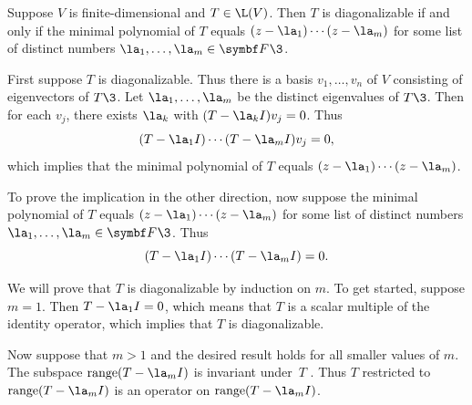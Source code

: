 \pagebreak[3]

{Suppose $V$ is finite-dimensional and $T \in \L(V)$. Then $T$ is diagonalizable if and only if the minimal polynomial of $T$ equals $(z-\la_1) \cdots (z-\la_m)$ for some list of distinct numbers $\la_1, \ldots, \la_m \in \F{}\3$.}

\proof
First suppose $T$ is diagonalizable. Thus there is a basis $v_1, \dots, v_n$ of $V$ consisting of eigenvectors of $T\3$.  Let
$\la_1, \dots, \la_m$ be the distinct eigenvalues of $T\3$.  Then for each $v_j$, there exists $\la_k$ with
$(T - \la_k I)v_j = 0$.  Thus
\[
(T - \la_1 I) \dotsm (T - \la_m I)v_j = 0,
\]
which implies that the minimal polynomial of $T$ equals $(z-\la_1) \cdots (z-\la_m)$.

To prove the implication in the other direction, now suppose the minimal polynomial of $T$ equals $(z-\la_1) \cdots (z-\la_m)$ for some list of distinct numbers $\la_1, \ldots, \la_m \in \F{}\3$. Thus
\begin{equation} \label{9Tr}
(T - \la_1 I) \dotsm (T - \la_m I) = 0.
\end{equation}%

We will prove that $T$ is diagonalizable by induction on $m$. To get started, suppose $m = 1$. Then $T - \la_1 I = 0$, which means that $T$ is a scalar multiple of the identity operator, which implies that $T$ is diagonalizable.

Now suppose that $m > 1$ and the desired result holds for all smaller values of $m$. The subspace $\ran(T-\la_m I)$ is invariant under~$T$ . Thus $T$ restricted to $\ran(T - \la_m I)$ is an operator on
$\ran(T - \la_m I)$.

